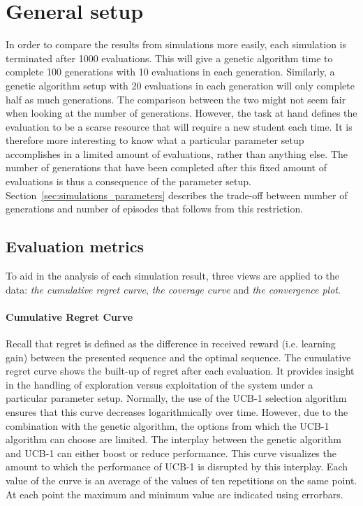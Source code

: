 \section{General setup}
\label{sec:simulations_setup}
In order to compare the results from simulations more easily, each
simulation is terminated after 1000 evaluations. This will give
a genetic algorithm time to complete 100 generations with 10 evaluations in
each generation. Similarly, a genetic algorithm setup with 20 evaluations in
each generation will only complete half as much generations. The comparison
between the two might not seem fair when looking at the number of generations.
However, the task at hand defines the evaluation to be a scarse resource that
will require a new student each time. It is therefore more interesting to know
what a particular parameter setup accomplishes in a limited amount of
evaluations, rather than anything else. The number of generations that have
been completed after this fixed amount of evaluations is thus a consequence of
the parameter setup. Section~\ref{sec:simulations_parameters} describes the
trade-off between number of generations and number of episodes that follows
from this restriction.
\subsection{Evaluation metrics}
To aid in the analysis of each simulation result, three views are applied to
the data: \emph{the cumulative regret curve}, \emph{the coverage curve} and
\emph{the convergence plot}.
\paragraph{Cumulative Regret Curve}
Recall that regret is defined as the difference in received reward (i.e.
learning gain) between the presented sequence and the optimal sequence.
The cumulative regret curve shows the built-up of regret after each
evaluation. It provides insight in the handling of exploration versus
exploitation of the system under a particular parameter setup.
Normally, the use of the UCB-1 selection algorithm ensures that
this curve decreases logarithmically over time. However, due to the
combination with the genetic algorithm, the options from which the UCB-1
algorithm can choose are limited. The interplay between the genetic algorithm
and UCB-1 can either boost or reduce performance. This curve visualizes
the amount to which the performance of UCB-1 is disrupted by this interplay.
Each value of the curve is an average of the values of ten repetitions
on the same point. At each point the maximum and minimum value are indicated
using errorbars.
